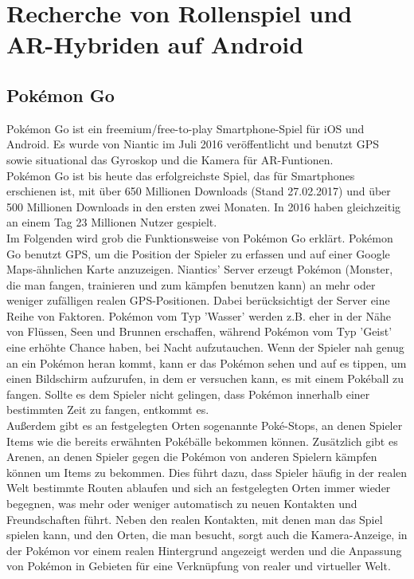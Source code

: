 \documentclass[extern,palatino]{cgBA}
\begin{document}
	\section{Recherche von Rollenspiel und AR-Hybriden auf Android}
	\subsection{Pokémon Go}
	Pokémon Go ist ein freemium/free-to-play Smartphone-Spiel für iOS und Android. Es wurde von Niantic im Juli 2016 veröffentlicht und benutzt GPS sowie situational das Gyroskop und die Kamera für AR-Funtionen.
	\\Pokémon Go ist bis heute das erfolgreichste Spiel, das für Smartphones erschienen ist, mit über 650 Millionen Downloads (Stand 27.02.2017) und über 500 Millionen Downloads in den ersten zwei  Monaten. %
	In 2016 haben gleichzeitig an einem Tag 23 Millionen Nutzer gespielt.
	\\
	Im Folgenden wird grob die Funktionsweise von Pokémon Go erklärt. Pokémon Go benutzt GPS, um die Position der Spieler zu erfassen und auf einer Google Maps-ähnlichen Karte anzuzeigen.
	Niantics' Server erzeugt Pokémon (Monster, die man fangen, trainieren und zum kämpfen benutzen kann) an mehr oder weniger zufälligen realen GPS-Positionen. Dabei berücksichtigt der Server eine Reihe von Faktoren. Pokémon vom Typ 'Wasser' werden z.B. eher in der Nähe von Flüssen, Seen und Brunnen erschaffen, während Pokémon vom Typ 'Geist' eine erhöhte Chance haben, bei Nacht aufzutauchen. Wenn der Spieler nah genug an ein Pokémon heran kommt, kann er das Pokémon sehen und auf es tippen, um einen Bildschirm aufzurufen, in dem er versuchen kann, es mit einem Pokéball zu fangen. Sollte es dem Spieler nicht gelingen, dass Pokémon innerhalb einer bestimmten Zeit zu fangen, entkommt es.
	\\Außerdem gibt es an festgelegten Orten sogenannte Poké-Stops, an denen Spieler Items wie die bereits erwähnten Pokébälle bekommen können. Zusätzlich gibt es Arenen, an denen Spieler gegen die Pokémon von anderen Spielern kämpfen können um Items zu bekommen. Dies führt dazu, dass Spieler häufig in der realen Welt bestimmte Routen ablaufen und sich an festgelegten Orten immer wieder begegnen, was mehr oder weniger automatisch zu neuen Kontakten und Freundschaften führt. Neben den realen Kontakten, mit denen man das Spiel spielen kann, und den Orten, die man besucht, sorgt auch die Kamera-Anzeige, in der Pokémon vor einem realen Hintergrund angezeigt werden und die Anpassung von Pokémon in Gebieten für eine Verknüpfung von realer und virtueller Welt. 
\end{document}
